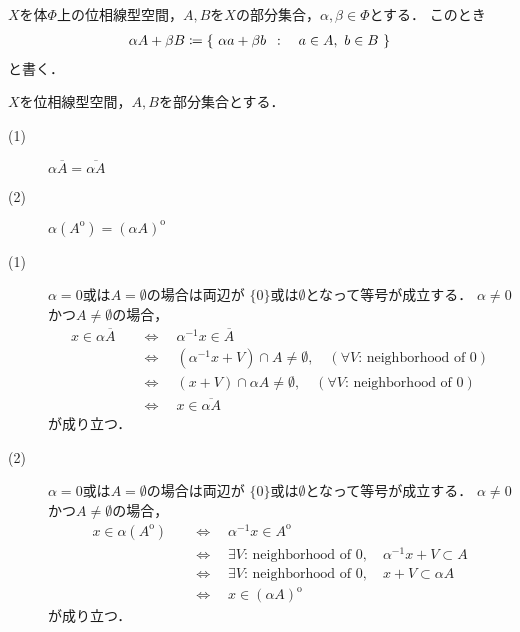 	\begin{screen}
		\begin{dfn}[集合の線型演算]
			$X$を体$\Phi$上の位相線型空間，$A,B$を$X$の部分集合，$\alpha,\beta \in \Phi$とする．
			このとき
			\begin{align}
				\alpha A + \beta B \coloneqq \left\{\ \alpha a + \beta b\ \, : \quad a \in A,\ b \in B\ \right\}
			\end{align}
			と書く．
		\end{dfn}
	\end{screen}
	
	\begin{screen}
		\begin{thm}
			$X$を位相線型空間，$A,B$を部分集合とする．
			\begin{description}
				\item[(1)] $\alpha \overline{A} = \overline{\alpha A}$
				\item[(2)] $\alpha (A^{\mathrm{o}}) = (\alpha A)^{\mathrm{o}}$
			\end{description}
		\end{thm}
	\end{screen}
	
	\begin{prf}\mbox{}
		\begin{description}
			\item[(1)] $\alpha = 0$或は$A = \emptyset$の場合は両辺が
				$\{0\}$或は$\emptyset$となって等号が成立する．
				$\alpha \neq 0$かつ$A \neq \emptyset$の場合，
				\begin{align}
					x \in \alpha \overline{A}
					\quad &\Longleftrightarrow \quad
					\alpha^{-1}x \in \overline{A} \\
					\quad &\Longleftrightarrow \quad
					\left(\alpha^{-1}x + V\right) \cap A \neq \emptyset, \quad 
						(\mbox{$\forall V$: neighborhood of 0}) \\
					\quad &\Longleftrightarrow \quad
					\left(x + V\right) \cap \alpha A \neq \emptyset, \quad 
						(\mbox{$\forall V$: neighborhood of 0}) \\
					\quad &\Longleftrightarrow \quad
					x \in \overline{\alpha A}
				\end{align}
				が成り立つ．
				
			\item[(2)] $\alpha = 0$或は$A = \emptyset$の場合は両辺が
				$\{0\}$或は$\emptyset$となって等号が成立する．
				$\alpha \neq 0$かつ$A \neq \emptyset$の場合，
				\begin{align}
					x \in \alpha (A^{\mathrm{o}})
					\quad &\Longleftrightarrow \quad
					\alpha^{-1}x \in A^{\mathrm{o}} \\
					\quad &\Longleftrightarrow \quad
					\mbox{$\exists V$: neighborhood of 0},\quad \alpha^{-1}x + V \subset A \\
					\quad &\Longleftrightarrow \quad
					\mbox{$\exists V$: neighborhood of 0},\quad x + V \subset \alpha A \\
					\quad &\Longleftrightarrow \quad
					x \in (\alpha A)^{\mathrm{o}}
				\end{align}
				が成り立つ．
				
		\end{description}
	\end{prf}
	
